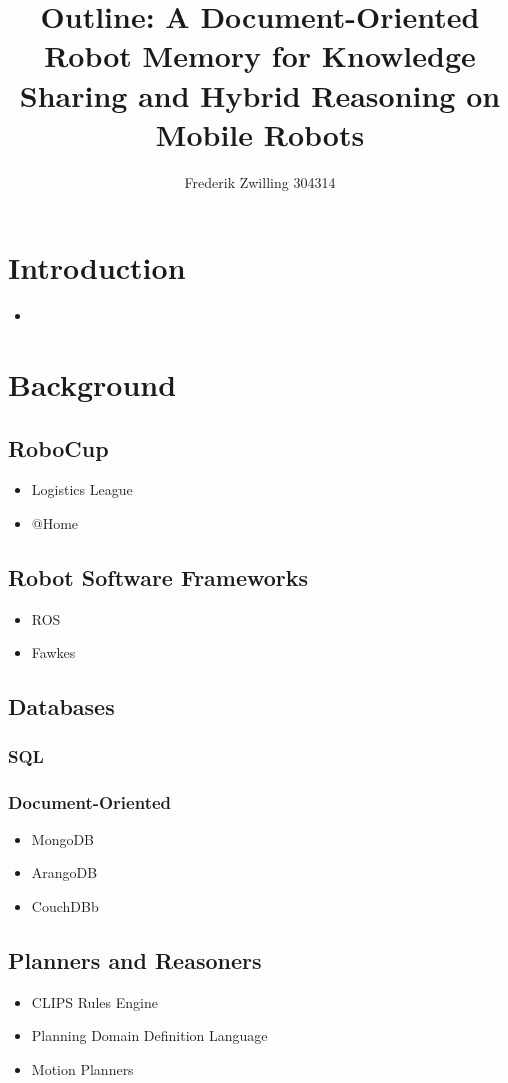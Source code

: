 \documentclass[a4paper,11pt]{article}
\author{Frederik Zwilling 304314}
\title{Outline: A Document-Oriented Robot Memory for Knowledge Sharing and Hybrid Reasoning on Mobile Robots}
\begin{document}
\maketitle
\tableofcontents
\newpage




\section{Introduction}
\begin{itemize}
\item 
\end{itemize}

\section{Background}
\subsection{RoboCup}
\begin{itemize}
\item Logistics League
\item @Home
\end{itemize}
\subsection{Robot Software Frameworks}
\begin{itemize}
\item ROS
\item Fawkes
\end{itemize}
\subsection{Databases}
\subsubsection{SQL}
\subsubsection{Document-Oriented}
\begin{itemize}
\item MongoDB
\item ArangoDB
\item CouchDBb
\end{itemize}
\subsection{Planners and Reasoners}
\begin{itemize}
\item CLIPS Rules Engine
\item Planning Domain Definition Language
\item Motion Planners
\end{itemize}
\end{document}
